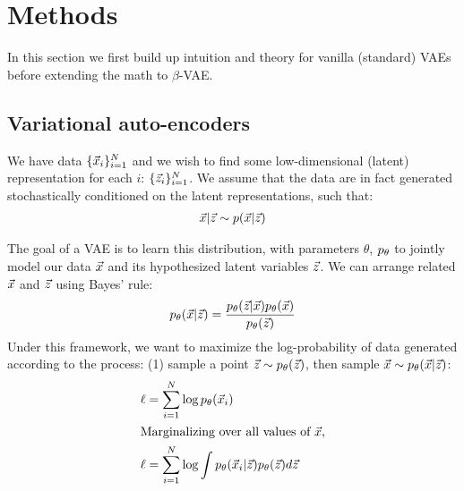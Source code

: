 \section{Methods}

In this section we first build up intuition and theory for vanilla (standard) VAEs before extending the math to $\beta$-VAE.

\subsection{Variational auto-encoders}

We have data $\{\vec{x}_i\}_{i=1}^N$ and we wish to find some low-dimensional (latent) representation for each $i$: $\{\vec{z}_i\}_{i=1}^N$. We assume that the data are in fact generated stochastically conditioned on the latent representations, such that:
\begin{align*}
    \vec{x}|\vec{z} \sim p(\vec{x}|\vec{z})
\end{align*}

The goal of a VAE is to learn this distribution, with parameters $\theta$, $p_\theta$ to jointly model our data $\vec{x}$ and its hypothesized latent variables $\vec{z}$. We can arrange related $\vec{x}$ and $\vec{z}$ using Bayes' rule:
\begin{equation*}
    p_\theta(\vec{x}|\vec{z}) = \frac{p_\theta(\vec{z}|\vec{x})p_\theta(\vec{x})}{p_\theta(\vec{z})}
\end{equation*}
Under this framework, we want to maximize the log-probability of data generated according to the process: (1) sample a point $\vec{z}\sim p_\theta(\vec{z})$, then sample $\vec{x}\sim p_\theta(\vec{x}|\vec{z})$:
\begin{align*}
    \ell &=\sum_{i=1}^N\log p_\theta(\vec{x}_i) \\
    \intertext{Marginalizing over all values of $\vec{x}$,}
    \ell&=\sum_{i=1}^N\log\int p_\theta(\vec{x}_i|\vec{z})p_\theta(\vec{z})d\vec{z}
\end{align*}



